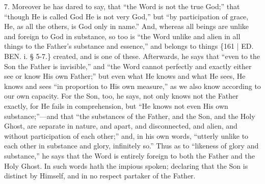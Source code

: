 7. Moreover he has dared to
say, that ``the Word is not the true God;'' that ``though He is called
God He is not very God,'' but ``by participation of grace, He, as all
the others, is God only in name.'' And, whereas all beings are unlike
and foreign to God in substance, so too is ``the Word unlike and alien
in all things to the Father's substance and essence,'' and belongs to
things \{161 | ED.
BEN.
i. § 5-7.\} created, and is one of these. Afterwards, he says that ``even
to the Son the Father is invisible,'' and ``the Word cannot perfectly
and exactly either see or know His own Father;'' but even what He knows
and what He sees, He knows and sees ``in proportion to His own measure,''
as we also know according to our own capacity. For the Son, too, he
says, not only knows not the Father exactly, for He fails in
comprehension, but ``He knows not even His own substance;''—and that ``the
substances of the Father, and the Son, and the Holy Ghost, are
separate in nature, and apart, and disconnected, and alien, and
without participation of each other;'' and, in his own words, ``utterly
unlike to each other in substance and glory, infinitely so.'' Thus as
to ``likeness of glory and substance,'' he says that the Word is
entirely foreign to both the Father and the Holy Ghost. In such words
hath the impious spoken; declaring that the Son is distinct by
Himself, and in no respect partaker of the Father.

